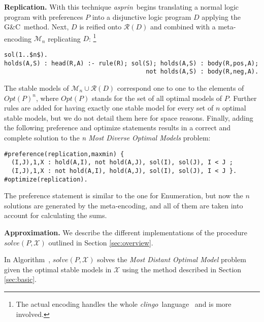 \documentclass[a4paper,UKenglish]{oasics}
\newcommand{\gc}[0]{G{\&}C}
\newcommand{\sysfont}{\textit}
\newcommand{\asprin}{\sysfont{asprin}}
\newcommand{\clingo}{\sysfont{clingo}}
\newcommand{\mysubsection}[2]{\smallskip\noindent\textbf{#1.}}
\newcommand{\Alabel}[1]{\textcolor{darkgray}{\small\sffamily\bfseries\mathversion{bold}{A-#1}}}
\begin{document}
\mysubsection{Replication}{sec:replication}
%
With this technique  \asprin\ begins translating a normal logic program with preferences $P$ 
into a disjunctive logic program $D$ applying the \gc\ method.
%
Next, $D$ is reified onto $\mathcal{R}(D)$ and combined with a meta-encoding $\mathcal{M}_n$ 
replicating $D$:%
\footnote{The actual encoding handles the whole \clingo\ language~\cite{gekakasc14b} and is more involved.}
\begin{lstlisting}[mathescape=true]
sol(1..$n$).
holds(A,S) : head(R,A) :- rule(R); sol(S); holds(A,S) : body(R,pos,A);
                                       not holds(A,S) : body(R,neg,A).
\end{lstlisting}
%
The stable models of $\mathcal{M}_n \cup \mathcal{R}(D)$ correspond one to one 
to the elements of $\mathit{Opt}(P)^n$, 
where $\mathit{Opt}(P)$ stands for the set of all optimal models of $P$.
%
Further rules are added for having exactly one stable model for every set of $n$ optimal stable models, 
but we do not detail them here for space reasons.
%
Finally, adding the following preference and optimize statements results  
in a correct and complete solution to the \emph{n Most Diverse Optimal Models} problem:
\begin{lstlisting}
#preference(replication,maxmin) { 
  (I,J),1,X : hold(A,I), not hold(A,J), sol(I), sol(J), I < J ; 
  (I,J),1,X : not hold(A,I), hold(A,J), sol(I), sol(J), I < J }.
#optimize(replication).
\end{lstlisting}
The preference statement is similar to the one for Enumeration, 
but now the $n$ solutions are generated by the meta-encoding, 
and all of them are taken into account for calculating the sums.

%
%
%
%

%
\makeatletter{}%

\mysubsection{Approximation}{sec:approximate:methods}
%
We describe the different implementations of the procedure 
$\mathit{solve}(P,\mathcal{X})$ outlined in Section \ref{sec:overview}. 

%
In Algorithm~\Alabel{1}, $\mathit{solve}(P,\mathcal{X})$ solves the
\emph{Most Distant Optimal Model} problem given the optimal stable models in $\mathcal{X}$
using the method described in Section \ref{sec:basic}. %
%
%
%
%
%
%
%
%
%
%
%
%
%
\end{document}
